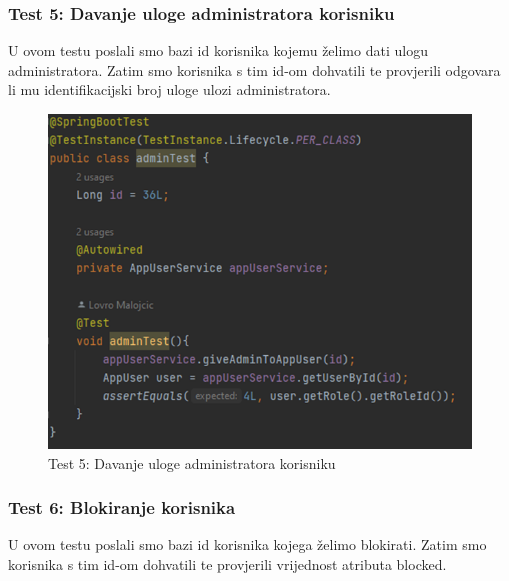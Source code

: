 				\subsubsection{Test 5: Davanje uloge administratora korisniku}
				
				U ovom testu poslali smo bazi id korisnika kojemu želimo dati ulogu administratora. Zatim smo korisnika s tim id-om dohvatili te provjerili odgovara li mu identifikacijski broj uloge ulozi administratora.
				
				\begin{figure}[H]
					\centering
					\includegraphics[width=12cm]{slike/davanjeAdminaKorisniku}
					\caption{Test 5: Davanje uloge administratora korisniku}
					\label{fig:Test-5}
				\end{figure}
			
				\subsubsection{Test 6: Blokiranje korisnika}
				
				U ovom testu poslali smo bazi id korisnika kojega želimo blokirati. Zatim smo korisnika s tim id-om dohvatili te provjerili vrijednost atributa blocked.
				
